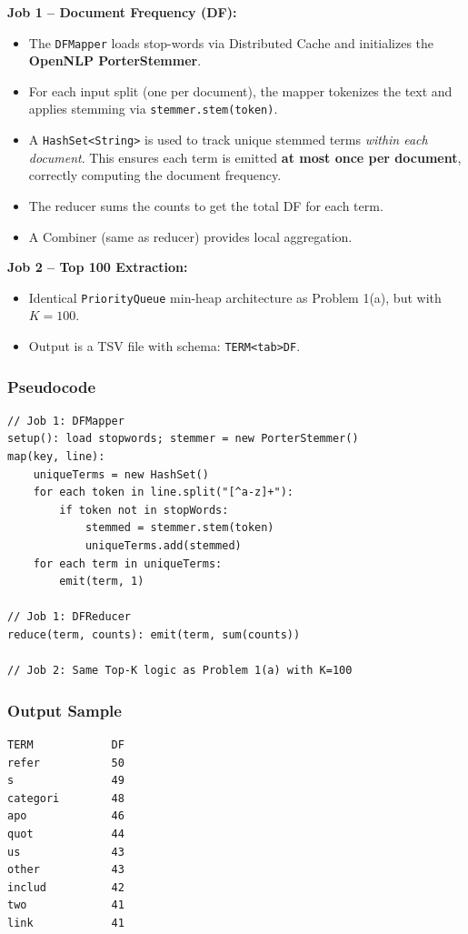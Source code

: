 \documentclass[12pt,a4paper]{article}
\begin{document}
\textbf{Job 1 -- Document Frequency (DF):}
\begin{itemize}
  \item The \texttt{DFMapper} loads stop-words via Distributed Cache and initializes the \textbf{OpenNLP PorterStemmer}.
  \item For each input split (one per document), the mapper tokenizes the text and applies stemming via \texttt{stemmer.stem(token)}.
  \item A \texttt{HashSet<String>} is used to track unique stemmed terms \emph{within each document}. This ensures each term is emitted \textbf{at most once per document}, correctly computing the document frequency.
  \item The reducer sums the counts to get the total DF for each term.
  \item A Combiner (same as reducer) provides local aggregation.
\end{itemize}

\textbf{Job 2 -- Top 100 Extraction:}
\begin{itemize}
  \item Identical \texttt{PriorityQueue} min-heap architecture as Problem 1(a), but with $K=100$.
  \item Output is a TSV file with schema: \texttt{TERM<tab>DF}.
\end{itemize}

\subsubsection{Pseudocode}
\begin{lstlisting}
// Job 1: DFMapper
setup(): load stopwords; stemmer = new PorterStemmer()
map(key, line):
    uniqueTerms = new HashSet()
    for each token in line.split("[^a-z]+"):
        if token not in stopWords:
            stemmed = stemmer.stem(token)
            uniqueTerms.add(stemmed)
    for each term in uniqueTerms:
        emit(term, 1)

// Job 1: DFReducer
reduce(term, counts): emit(term, sum(counts))

// Job 2: Same Top-K logic as Problem 1(a) with K=100
\end{lstlisting}

\subsubsection{Output Sample}
\begin{lstlisting}
TERM            DF
refer           50
s               49
categori        48
apo             46
quot            44
us              43
other           43
includ          42
two             41
link            41
\end{lstlisting}
\end{document}
